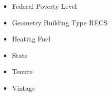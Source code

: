 \begin{itemize}
\item Federal Poverty Level
\item Geometry Building Type RECS
\item Heating Fuel
\item State
\item Tenure
\item Vintage
\end{itemize}
